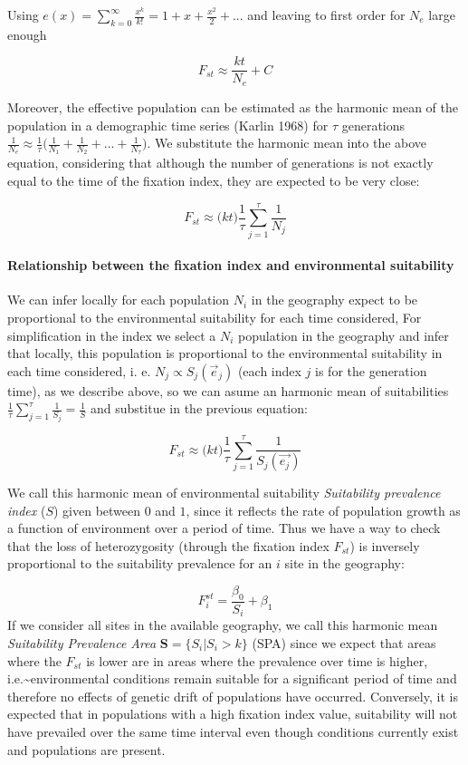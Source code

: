 \documentclass[
]{article}
\begin{document}
Using
\(e(x) = \sum_{k=0}^{\infty} \frac{x^k}{k!} = 1 + x + \frac{x^2}{2} + ...\)
and leaving to first order for \(N_e\) large enough

\[
F_{st} \approx \frac{kt}{N_e} + C
\]

Moreover, the effective population can be estimated as the harmonic mean
of the population in a demographic time series (Karlin 1968) for
\(\tau\) generations
\(\frac{1}{N_e} \approx \frac{1}{\tau}\Big({\frac{1}{N_1} + \frac{1}{N_2} + ... + \frac{1}{N_\tau} } \Big)\).
We substitute the harmonic mean into the above equation, considering
that although the number of generations is not exactly equal to the time
of the fixation index, they are expected to be very close:

\[
F_{st} \approx \Big (kt\Big)  \frac{1}{\tau}\sum_{j=1}^{\tau}\frac{1}{N_j} 
\]

\hypertarget{relationship-between-the-fixation-index-and-environmental-suitability}{%
\paragraph{Relationship between the fixation index and environmental
suitability}\label{relationship-between-the-fixation-index-and-environmental-suitability}}

We can infer locally for each population \(N_i\) in the geography expect
to be proportional to the environmental suitability for each time
considered, For simplification in the index we select a \(N_i\)
population in the geography and infer that locally, this population is
proportional to the environmental suitability in each time considered,
i. e. \(N_{j} \propto S_{j}(\vec{e}_{j})\) (each index \(j\) is for the
generation time), as we describe above, so we can asume an harmonic mean
of suitabilities
\(\frac{1}{\tau}\sum_{j = 1}^{\tau} \frac{1}{S_j} = \frac{1}{S}\) and
substitue in the previous equation:

\[
F_{st} \approx \Big (kt\Big)  \frac{1}{\tau}\sum_{j=1}^{\tau}\frac{1}{S_j(\vec{e_j})}
\]

We call this harmonic mean of environmental suitability
\emph{Suitability prevalence index }(\(S\)) given between \(0\) and
\(1\), since it reflects the rate of population growth as a function of
environment over a period of time. Thus we have a way to check that the
loss of heterozygosity (through the fixation index \(F_{st}\)) is
inversely proportional to the suitability prevalence for an \(i\) site
in the geography:

\[
F_{i}^{st}= \frac{\beta_0}{S_i} + \beta_1
\] If we consider all sites in the available geography, we call this
harmonic mean \emph{Suitability Prevalence Area}
\(\mathbf{S} = \{S_i | S_i > k\}\) (SPA) since we expect that areas
where the \(F_{st}\) is lower are in areas where the prevalence over
time is higher, i.e.\textasciitilde environmental conditions remain
suitable for a significant period of time and therefore no effects of
genetic drift of populations have occurred. Conversely, it is expected
that in populations with a high fixation index value, suitability will
not have prevailed over the same time interval even though conditions
currently exist and populations are present.
\end{document}
